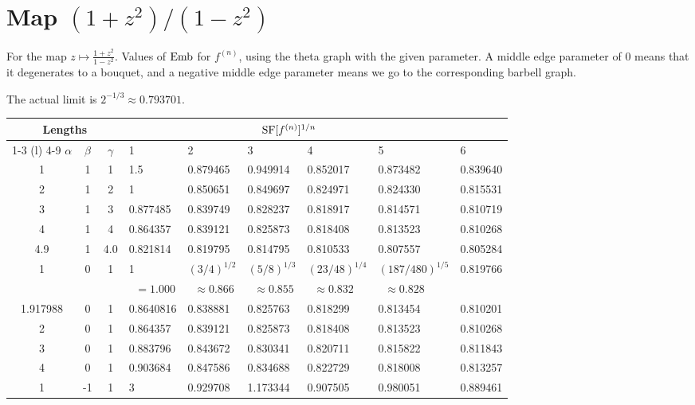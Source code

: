 \documentclass[12pt]{amsart}
\begin{document}
\section{Map $(1+z^2)/(1-z^2)$}
For the map $z \mapsto \frac{1+z^2}{1-z^2}$. Values of $\operatorname{Emb}$ for
$f^{(n)}$, using the theta graph with the given parameter. A middle
edge parameter of $0$ means that it degenerates to a bouquet, and a
negative middle edge parameter means we go to the corresponding
barbell graph.

The actual limit is $2^{-1/3} \approx 0.793701$.

\medskip
\begin{tabular}{cccllllll}
  \toprule
  \multicolumn{3}{c}{Lengths} & \multicolumn{5}{c}{$\operatorname{SF}[f^{(n)}]^{1/n}$}
  \\ \cmidrule(r){1-3} \cmidrule(l) {4-9}
  $\alpha$ & $\beta$ & $\gamma$ &
    1 & 2 & 3 & 4 & 5 & 6\\
  \midrule
  1 & 1 & 1 & 1.5 & 0.879465 & 0.949914 & 0.852017 & 0.873482 & 0.839640\\
  2 & 1 & 2 & 1 & 0.850651 & 0.849697 & 0.824971 & 0.824330 & 0.815531\\
  3 & 1 & 3 & 0.877485 & 0.839749 & 0.828237 & 0.818917 & 0.814571 & 0.810719 \\
  4 & 1 & 4 & 0.864357 & 0.839121 & 0.825873 & 0.818408 & 0.813523 & 0.810268\\
  4.9 & 1 & 4.0 & 0.821814 & 0.819795 & 0.814795 & 0.810533 & 0.807557
     & 0.805284\\
  1 & 0 & 1 & 1 & $(3/4)^{1/2}$ & $(5/8)^{1/3}$ & $(23/48)^{1/4}$ &
     $(187/480)^{1/5}$ & 0.819766 \\
  &&& $\;\; = 1.000$ & $\;\;\approx 0.866$ & $\;\;\approx 0.855$ &
    $\;\;\approx 0.832$ & $\;\;\approx 0.828$ \\
  1.917988 & 0 & 1 & 0.8640816 & 0.838881 & 0.825763 & 0.818299 & 0.813454 & 0.810201\\
  2 & 0 & 1 & 0.864357 & 0.839121 & 0.825873 & 0.818408 & 0.813523 & 0.810268\\
  3 & 0 & 1 & 0.883796 & 0.843672 & 0.830341 & 0.820711 & 0.815822 & 0.811843\\
  4 & 0 & 1 & 0.903684 & 0.847586 & 0.834688 & 0.822729 & 0.818008 & 0.813257\\
  1 & -1 & 1 & 3 & 0.929708 & 1.173344 & 0.907505 & 0.980051 & 0.889461\\
  \bottomrule
\end{tabular}
\end{document}
